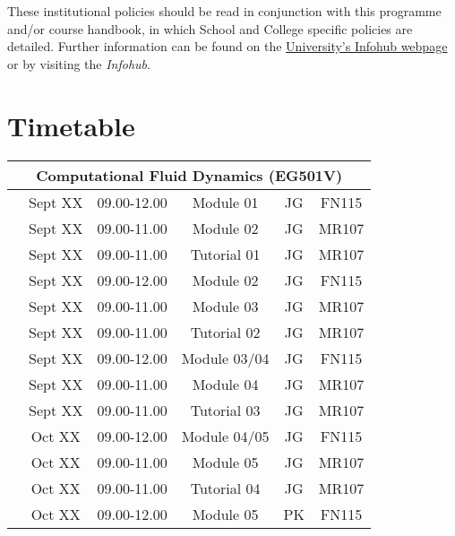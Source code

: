 \documentclass[12pts,a4paper,amsmath,amssymb,floatfix]{article}%
\begin{document}
These institutional policies should be read in conjunction with this programme and/or course handbook, in which School and College specific policies are detailed. Further information can be found on the \href{http:www.abdn.ac.uk/infohub/}{University's Infohub webpage} or by visiting the {\it Infohub}.

\clearpage




\section{Timetable}

\begin{center}
\begin{tabular}{||c||c|c|c|c|c||}
\hline\hline
\multicolumn{6}{||c||}{Computational Fluid Dynamics (EG501V)} \\
\hline\hline
\multirow{3}{*}{\color{red}{Week 7}}  & Sept XX   & 09.00-12.00 & Module 01   & JG  & FN115 \\
                                      & Sept XX   & 09.00-11.00 & Module 02   & JG  & MR107 \\
                                      & Sept XX   & 09.00-11.00 & Tutorial 01 & JG  & MR107 \\
\hline
\multirow{3}{*}{\color{red}{Week 8}}  & Sept XX   & 09.00-12.00 & Module 02   & JG  & FN115 \\
                                      & Sept XX   & 09.00-11.00 & Module 03   & JG  & MR107 \\
                                      & Sept XX   & 09.00-11.00 & Tutorial 02 & JG  & MR107 \\
\hline
\multirow{3}{*}{\color{red}{Week 9}}  & Sept XX   & 09.00-12.00 & Module 03/04 & JG  & FN115 \\
                                      & Sept XX   & 09.00-11.00 & Module 04   & JG  & MR107 \\
                                      & Sept XX   & 09.00-11.00 & Tutorial 03 & JG  & MR107 \\
\hline
\multirow{3}{*}{\color{red}{Week 10}} & Oct XX    & 09.00-12.00 & Module 04/05 & JG  & FN115 \\
                                      & Oct XX    & 09.00-11.00 & Module 05   & JG  & MR107 \\
                                      & Oct XX    & 09.00-11.00 & Tutorial 04 & JG  & MR107 \\
\hline
\multirow{3}{*}{\color{red}{Week 11}} & Oct XX    & 09.00-12.00 & Module 05   & PK  & FN115 \\

\end{tabular}
\end{center}
\end{document}

